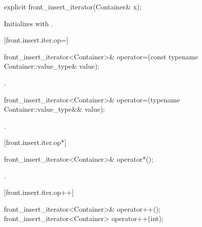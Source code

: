 \begin{itemdecl}
explicit front_insert_iterator(Container& x);
\end{itemdecl}

\begin{itemdescr}
\pnum
\effects
Initializes
with .
\end{itemdescr}

[front.insert.iter.op=]{}

%
\begin{itemdecl}
front_insert_iterator<Container>&
  operator=(const typename Container::value_type& value);
\end{itemdecl}

\begin{itemdescr}
\pnum
\effects
{}

\pnum
\returns
{}.
\end{itemdescr}

%
\begin{itemdecl}
front_insert_iterator<Container>&
  operator=(typename Container::value_type&& value);
\end{itemdecl}

\begin{itemdescr}
\pnum
\effects
{}

\pnum
\returns
{}.
\end{itemdescr}

[front.insert.iter.op*]{}

%
\begin{itemdecl}
front_insert_iterator<Container>& operator*();
\end{itemdecl}

\begin{itemdescr}
\pnum
\returns
{}.
\end{itemdescr}

[front.insert.iter.op++]{}

%
\begin{itemdecl}
front_insert_iterator<Container>& operator++();
front_insert_iterator<Container>  operator++(int);
\end{itemdecl}


